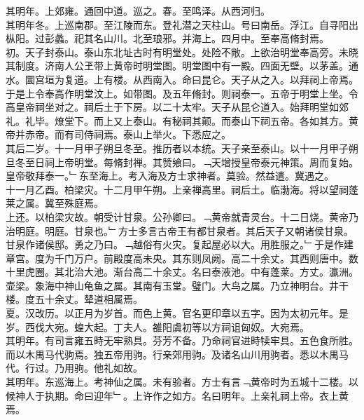 \documentclass{zhvt-classic}
\begin{document}
\hspace*{2em}其明年。上郊雍。通回中道。巡之。春。至鸣泽。从西河归。\\
\hspace*{2em}其明年冬。上巡南郡。至江陵而东。登礼潜之天柱山。号曰南岳。浮江。自寻阳出枞阳。过彭蠡。祀其名山川。北至琅邪。并海上。四月中。至奉高脩封焉。\\
\hspace*{2em}初。天子封泰山。泰山东北址古时有明堂处。处险不敞。上欲治明堂奉高旁。未晓其制度。济南人公玊带上黄帝时明堂图。明堂图中有一殿。四面无壁。以茅盖。通水。圜宫垣为复道。上有楼。从西南入。命曰昆仑。天子从之入。以拜祠上帝焉。于是上令奉高作明堂汶上。如带图。及五年脩封。则祠泰一。五帝于明堂上坐。令高皇帝祠坐对之。祠后土于下房。以二十太牢。天子从昆仑道入。始拜明堂如郊礼。礼毕。燎堂下。而上又上泰山。有秘祠其颠。而泰山下祠五帝。各如其方。黄帝并赤帝。而有司侍祠焉。泰山上举火。下悉应之。\\
\hspace*{2em}其后二岁。十一月甲子朔旦冬至。推历者以本统。天子亲至泰山。以十一月甲子朔旦冬至日祠上帝明堂。每脩封禅。其赞飨曰。﹁天增授皇帝泰元神策。周而复始。皇帝敬拜泰一。﹂东至海上。考入海及方士求神者。莫验。然益遣。冀遇之。\\
\hspace*{2em}十一月乙酉。柏梁灾。十二月甲午朔。上亲禅高里。祠后土。临渤海。将以望祠蓬莱之属。冀至殊庭焉。\\
\hspace*{2em}上还。以柏梁灾故。朝受计甘泉。公孙卿曰。﹁黄帝就青灵台。十二日烧。黄帝乃治明庭。明庭。甘泉也。﹂方士多言古帝王有都甘泉者。其后天子又朝诸侯甘泉。甘泉作诸侯邸。勇之乃曰。﹁越俗有火灾。复起屋必以大。用胜服之。﹂于是作建章宫。度为千门万户。前殿度高未央。其东则凤阙。高二十余丈。其西则唐中。数十里虎圈。其北治大池。渐台高二十余丈。名曰泰液池。中有蓬莱。方丈。瀛洲。壶梁。象海中神山龟鱼之属。其南有玉堂。璧门。大鸟之属。乃立神明台。井干楼。度五十余丈。辇道相属焉。\\
\hspace*{2em}夏。汉改历。以正月为岁首。而色上黄。官名更印章以五字。因为太初元年。是岁。西伐大宛。蝗大起。丁夫人。雒阳虞初等以方祠诅匈奴。大宛焉。\\
\hspace*{2em}其明年。有司言雍五畤无牢熟具。芬芳不备。乃命祠官进畤犊牢具。五色食所胜。而以木禺马代驹焉。独五帝用驹。行亲郊用驹。及诸名山川用驹者。悉以木禺马代。行过。乃用驹。他礼如故。\\
\hspace*{2em}其明年。东巡海上。考神仙之属。未有验者。方士有言﹁黄帝时为五城十二楼。以候神人于执期。命曰迎年﹂。上许作之如方。名曰明年。上亲礼祠上帝。衣上黄焉。\\
\end{document}
